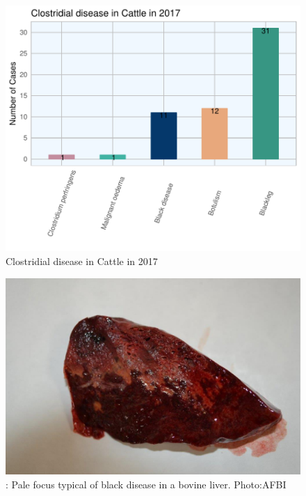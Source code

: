 \documentclass[]{book}
\begin{document}
\begin{figure}

{\centering \includegraphics{AFBI_files/figure-latex/unnamed-chunk-41-1} 

}

\caption{Clostridial disease in Cattle in 2017}\label{fig:unnamed-chunk-41}
\end{figure}

\begin{figure}

{\centering \includegraphics[width=14.22in]{_images/blackDisease} 

}

\caption{: Pale focus typical of black disease in a bovine liver. Photo:AFBI}\label{fig:foo2}
\end{figure}
\end{document}
